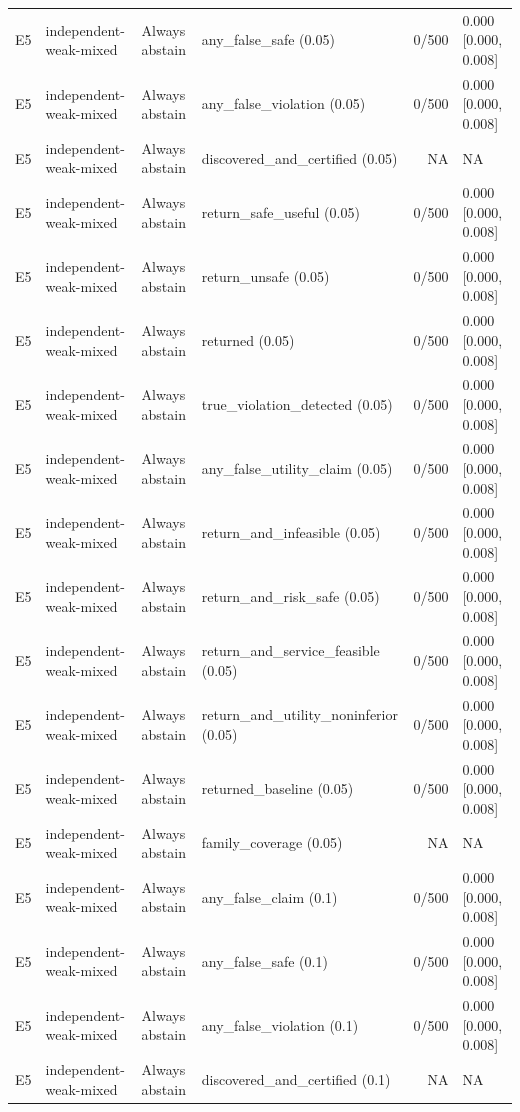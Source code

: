 \begin{longtable}{p{.04\linewidth}p{.18\linewidth}p{.19\linewidth}p{.16\linewidth}r p{.21\linewidth}}
E5 & independent-weak-mixed & Always abstain & any\_false\_safe (0.05) & 0/500 & 0.000 [0.000, 0.008]\\
E5 & independent-weak-mixed & Always abstain & any\_false\_violation (0.05) & 0/500 & 0.000 [0.000, 0.008]\\
E5 & independent-weak-mixed & Always abstain & discovered\_and\_certified (0.05) & NA & NA\\
E5 & independent-weak-mixed & Always abstain & return\_safe\_useful (0.05) & 0/500 & 0.000 [0.000, 0.008]\\
E5 & independent-weak-mixed & Always abstain & return\_unsafe (0.05) & 0/500 & 0.000 [0.000, 0.008]\\
E5 & independent-weak-mixed & Always abstain & returned (0.05) & 0/500 & 0.000 [0.000, 0.008]\\
E5 & independent-weak-mixed & Always abstain & true\_violation\_detected (0.05) & 0/500 & 0.000 [0.000, 0.008]\\
E5 & independent-weak-mixed & Always abstain & any\_false\_utility\_claim (0.05) & 0/500 & 0.000 [0.000, 0.008]\\
E5 & independent-weak-mixed & Always abstain & return\_and\_infeasible (0.05) & 0/500 & 0.000 [0.000, 0.008]\\
E5 & independent-weak-mixed & Always abstain & return\_and\_risk\_safe (0.05) & 0/500 & 0.000 [0.000, 0.008]\\
E5 & independent-weak-mixed & Always abstain & return\_and\_service\_feasible (0.05) & 0/500 & 0.000 [0.000, 0.008]\\
E5 & independent-weak-mixed & Always abstain & return\_and\_utility\_noninferior (0.05) & 0/500 & 0.000 [0.000, 0.008]\\
E5 & independent-weak-mixed & Always abstain & returned\_baseline (0.05) & 0/500 & 0.000 [0.000, 0.008]\\
E5 & independent-weak-mixed & Always abstain & family\_coverage (0.05) & NA & NA\\
E5 & independent-weak-mixed & Always abstain & any\_false\_claim (0.1) & 0/500 & 0.000 [0.000, 0.008]\\
E5 & independent-weak-mixed & Always abstain & any\_false\_safe (0.1) & 0/500 & 0.000 [0.000, 0.008]\\
E5 & independent-weak-mixed & Always abstain & any\_false\_violation (0.1) & 0/500 & 0.000 [0.000, 0.008]\\
E5 & independent-weak-mixed & Always abstain & discovered\_and\_certified (0.1) & NA & NA\\

\end{longtable}

